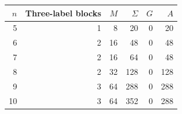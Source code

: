 \begin{center}\small
\renewcommand{\arraystretch}{1.15}
\begin{tabular}{@{}rrrrrr@{}}\toprule
\(n\)&Three-label blocks&\(M\)&\(\Sigma\)&\(G\)&\(A\)\\\midrule
5&1&8&20&0&20\\
6&2&16&48&0&48\\
7&2&16&64&0&48\\
8&2&32&128&0&128\\
9&3&64&288&0&288\\
10&3&64&352&0&288\\
\bottomrule\end{tabular}\end{center}
